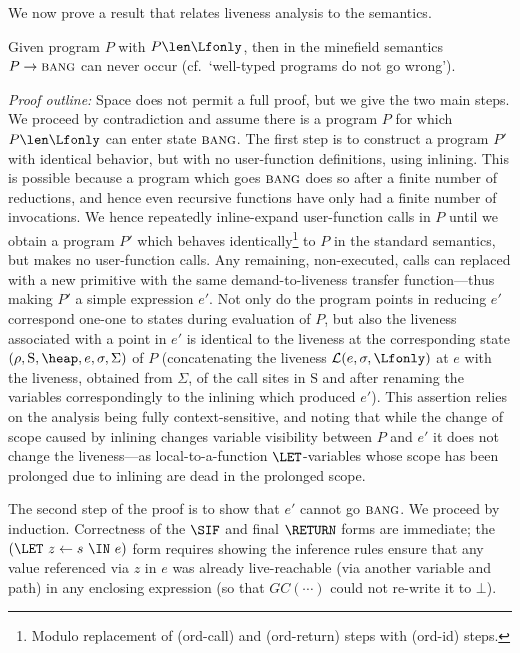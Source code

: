 \documentclass{llncs}
\newcommand{\stk}{\mbox{S}}       %
\newcommand{\bang}{\mbox{\sc bang}}
\begin{document}
 We now prove a result that relates
liveness analysis to the semantics.
\begin{proposition}
Given program $P$ with $P \len \Lfonly$, then in the minefield
 semantics $P \rightarrow \bang$ can never occur
 (cf.\ `well-typed programs do not go wrong').
\end{proposition}
\textit{Proof outline:}
Space does not permit a full proof, but we give the two main steps.
We proceed by contradiction and assume there is a program $P$ for which
$P \len \Lfonly$ can enter state $\bang$.
The first step is to construct a program $P'$ with identical behavior, but with
no user-function definitions, using inlining.
This is possible because a program which goes $\bang$ does so after a finite number
of reductions, and hence even recursive functions have only had a finite number of
invocations.
We hence repeatedly inline-expand user-function calls in $P$
until we obtain a program $P'$ which behaves identically\footnote{
Modulo replacement of
({\sc ord-call}) and
({\sc ord-return}) steps with
({\sc ord-id}) steps.
}
to $P$ in the standard semantics, but makes no user-function calls.
Any remaining, non-executed, calls can 
replaced with a new primitive with the same
demand-to-liveness transfer function---thus making
$P'$ a simple expression $e'$.
Not only do the program points in reducing $e'$ correspond
one-one to states during evaluation of $P$,
but also the liveness associated with a point
in $e'$ is identical to the liveness at the corresponding state
$(\rho, \stk, \heap, e, \sigma, \Sigma)$ of $P$ (concatenating the liveness
$\mathcal{L}(e,\sigma,\Lfonly)$ at $e$
with the liveness, obtained from $\Sigma$, of the call sites in $\stk$ and
after renaming the variables correspondingly to the inlining which produced $e'$).
This assertion relies on the analysis being fully context-sensitive, and noting that
while the change of scope caused by inlining changes variable visibility
between $P$ and $e'$ it does not change the liveness---as local-to-a-function
$\LET$-variables whose scope has been prolonged due to inlining
are dead in the prolonged scope.

The second step of the proof is to show that $e'$ cannot go $\bang$.
We proceed by induction.
Correctness of the $\SIF$ and final $\RETURN$ forms are immediate;
the $(\LET~z\leftarrow s~\IN~e)$ form requires showing
the inference rules ensure that any value referenced via $z$ in $e$
was already live-reachable (via another variable and path) in any
enclosing expression (so that $\mathit{GC}(\cdots)$ could not re-write it to $\bot$).
\end{document}
